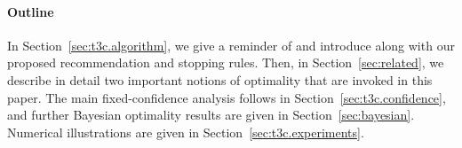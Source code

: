 \paragraph{Outline} In Section~\ref{sec:t3c.algorithm}, we give a reminder of \TTTS and introduce \TCC along with our proposed recommendation and stopping rules. Then, in Section~\ref{sec:related}, we describe in detail two important notions of optimality that are invoked in this paper. The main fixed-confidence analysis follows in Section~\ref{sec:t3c.confidence}, and further Bayesian optimality results are given in Section~\ref{sec:bayesian}. Numerical illustrations are given in Section~\ref{sec:t3c.experiments}.
